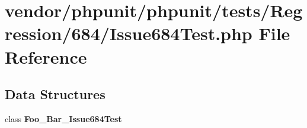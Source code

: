 \section{vendor/phpunit/phpunit/tests/\+Regression/684/\+Issue684\+Test.php File Reference}
\label{_issue684_test_8php}
\subsection*{Data Structures}
\begin{DoxyCompactItemize}
\item 
class {\bf Foo\+\_\+\+Bar\+\_\+\+Issue684\+Test}
\end{DoxyCompactItemize}
